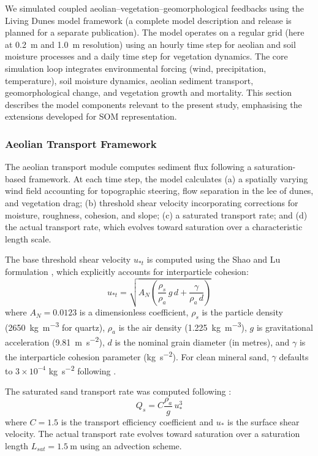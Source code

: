 \documentclass[authoryear,preprint,review,12pt]{elsarticle}
\newcommand{\ust}{u_{*t}}
\newcommand{\usw}{u_{*}}
\begin{document}
We simulated coupled aeolian--vegetation--geomorphological feedbacks using the Living Dunes model framework (a complete model description and release is planned for a separate publication). The model operates on a regular grid (here at \SI{0.2}{\metre} and \SI{1.0}{\metre} resolution) using an hourly time step for aeolian and soil moisture processes and a daily time step for vegetation dynamics. The core simulation loop integrates environmental forcing (wind, precipitation, temperature), soil moisture dynamics, aeolian sediment transport, geomorphological change, and vegetation growth and mortality. This section describes the model components relevant to the present study, emphasising the extensions developed for SOM representation.

\subsubsection{Aeolian Transport Framework}

The aeolian transport module computes sediment flux following a saturation-based framework. At each time step, the model calculates (a) a spatially varying wind field accounting for topographic steering, flow separation in the lee of dunes, and vegetation drag; (b) threshold shear velocity incorporating corrections for moisture, roughness, cohesion, and slope; (c) a saturated transport rate; and (d) the actual transport rate, which evolves toward saturation over a characteristic length scale.

The base threshold shear velocity $\ust$ is computed using the Shao and Lu formulation \citep{shao2000simple}, which explicitly accounts for interparticle cohesion:
\begin{equation}
\ust = \sqrt{A_N \left(\frac{\rho_s}{\rho_a}\, g \, d + \frac{\gamma}{\rho_a \, d}\right)}
\label{eq:shao_lu}
\end{equation}
where $A_N = 0.0123$ is a dimensionless coefficient, $\rho_s$ is the particle density (\SI{2650}{\kilo\gram\per\cubic\metre} for quartz), $\rho_a$ is the air density (\SI{1.225}{\kilo\gram\per\cubic\metre}), $g$ is gravitational acceleration (\SI{9.81}{\metre\per\second\squared}), $d$ is the nominal grain diameter (in metres), and $\gamma$ is the interparticle cohesion parameter (\si{\kilo\gram\per\second\squared}). For clean mineral sand, $\gamma$ defaults to $3 \times 10^{-4}$ \si{\kilo\gram\per\second\squared} following \citet{greeley1985wind}.

The saturated sand transport rate was computed following \citet{bagnold1941physics}:
\begin{equation}
Q_s = C \frac{\rho_a}{g}\, \usw^3
\label{eq:bagnold_transport}
\end{equation}
where $C = 1.5$ is the transport efficiency coefficient and $\usw$ is the surface shear velocity. The actual transport rate evolves toward saturation over a saturation length $L_{sat} = \SI{1.5}{\metre}$ using an advection scheme.
\end{document}
